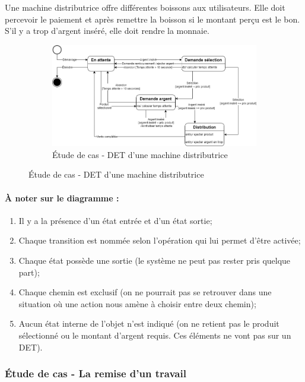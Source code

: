Une machine distributrice offre différentes boissons aux utilisateurs. Elle doit percevoir le paiement et après remettre la boisson si le montant perçu est le bon. S'il y a trop d'argent inséré, elle doit rendre la monnaie.

\begin{figure}
	\begin{figure}[H]
		\caption{Étude de cas - DET d'une machine distributrice}
		\centering
		\includegraphics[scale=0.5]{cas-distributrice.png}
	\end{figure}
\end{figure}

\paragraph{À noter sur le diagramme : } 

\begin{enumerate}
	\item Il y a la présence d'un état entrée et d'un état sortie;
	\item Chaque transition est nommée selon l'opération qui lui permet d'être activée;
	\item Chaque état possède une sortie (le système ne peut pas rester pris quelque part);
	\item Chaque chemin est exclusif (on ne pourrait pas se retrouver dans une situation où une action nous amène à choisir entre deux chemin);
	\item Aucun état interne de l'objet n'est indiqué (on ne retient pas le produit sélectionné ou le montant d'argent requis. Ces éléments ne vont pas sur un DET).
\end{enumerate}

\clearpage

\subsubsection{Étude de cas - La remise d'un travail}

